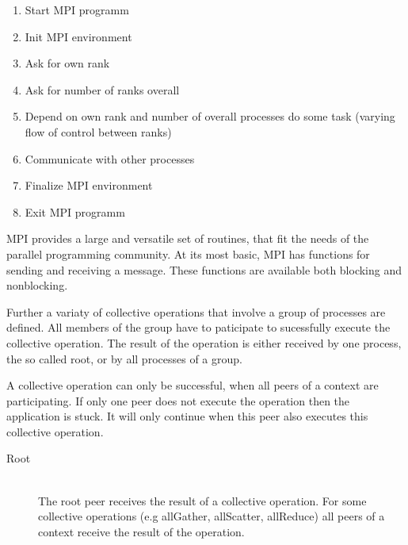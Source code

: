 \begin{enumerate}
\item Start MPI programm
\item Init MPI environment
\item Ask for own rank
\item Ask for number of ranks overall
\item Depend on own rank and number of overall processes do some task
  (varying flow of control between ranks)
\item Communicate with other processes
\item Finalize MPI environment
\item Exit MPI programm
\end{enumerate}

MPI provides a large and versatile set of routines, that fit the needs
of the parallel programming community. At its most basic, MPI has
functions for sending and receiving a message.  These functions are
available both blocking and nonblocking.

Further a variaty of collective operations that involve a group of
processes are defined. All members of the group have to paticipate to
sucessfully execute the collective operation.  The result of the
operation is either received by one process, the so called root, or by
all processes of a group.

A collective operation can only be successful, when all peers of a
context are participating. If only one peer does not execute the
operation then the application is stuck. It will only continue when
this peer also executes this collective operation.

\begin{description}
\item[Root] \hfill \\
  The root peer receives the result of a collective operation. For some
  collective operations (e.g allGather, allScatter, allReduce) all peers
  of a context receive the result of the operation.
\end{description}


